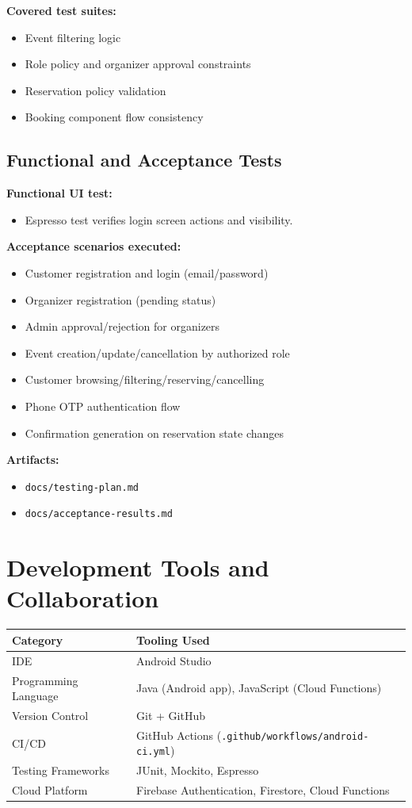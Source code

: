 \documentclass[12pt,a4paper]{article}
\begin{document}
\textbf{Covered test suites:}
\begin{itemize}
    \item Event filtering logic
    \item Role policy and organizer approval constraints
    \item Reservation policy validation
    \item Booking component flow consistency
\end{itemize}

\subsection{Functional and Acceptance Tests}

\textbf{Functional UI test:}
\begin{itemize}
    \item Espresso test verifies login screen actions and visibility.
\end{itemize}

\textbf{Acceptance scenarios executed:}
\begin{itemize}
    \item Customer registration and login (email/password)
    \item Organizer registration (pending status)
    \item Admin approval/rejection for organizers
    \item Event creation/update/cancellation by authorized role
    \item Customer browsing/filtering/reserving/cancelling
    \item Phone OTP authentication flow
    \item Confirmation generation on reservation state changes
\end{itemize}

\textbf{Artifacts:}
\begin{itemize}
    \item \texttt{docs/testing-plan.md}
    \item \texttt{docs/acceptance-results.md}
\end{itemize}

\section{Development Tools and Collaboration}

\begin{longtable}{p{4.2cm}p{10cm}}
\toprule
\textbf{Category} & \textbf{Tooling Used} \\
\midrule
IDE & Android Studio \\
Programming Language & Java (Android app), JavaScript (Cloud Functions) \\
Version Control & Git + GitHub \\
CI/CD & GitHub Actions (\texttt{.github/workflows/android-ci.yml}) \\
Testing Frameworks & JUnit, Mockito, Espresso \\
Cloud Platform & Firebase Authentication, Firestore, Cloud Functions \\
\bottomrule
\end{longtable}
\end{document}
